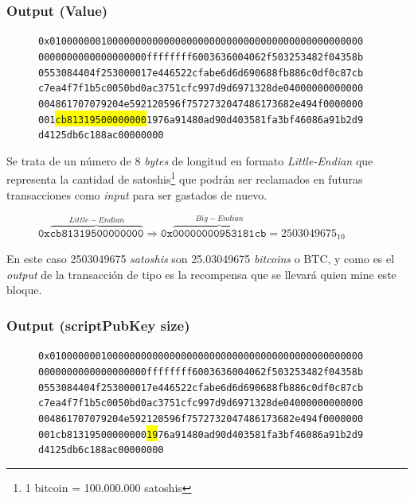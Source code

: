 \documentclass{article}
\begin{document}
    \subsubsection{Output (Value)}
    
    \begin{figure}[H]
        \texttt{0x0100000001000000000000000000000000000000000000000000000} \\
        \texttt{0000000000000000000ffffffff6003636004062f503253482f04358b} \\
        \texttt{0553084404f253000017e446522cfabe6d6d690688fb886c0df0c87cb} \\
        \texttt{c7ea4f7f1b5c0050bd0ac3751cfc997d9d6971328de04000000000000} \\
        \texttt{004861707079204e592120596f7572732047486173682e494f0000000} \\
        \texttt{001\colorbox{Yellow}{cb81319500000000}1976a91480ad90d403581fa3bf46086a91b2d9} \\
        \texttt{d4125db6c188ac00000000}
    \end{figure}
    
    Se trata de un número de 8 \textit{bytes} de longitud en formato \textit{Little-Endian} que representa la cantidad de satoshis\footnote{1 bitcoin = 100.000.000 satoshis} que podrán ser reclamados en futuras transacciones como \textit{input} para ser gastados de nuevo.
    \begin{figure}[H]
    \centering
        $\texttt{0x}\overbrace{\texttt{cb81319500000000}}^{Little-Endian} \Rightarrow \texttt{0x}\overbrace{\texttt{00000000953181cb}}^{Big-Endian} = 2503049675_{10}$
    \end{figure}
    
    En este caso 2503049675 \textit{satoshis} son 25.03049675 \textit{bitcoins} o BTC, y como es el \textit{output} de la transacción de tipo  es la recompensa que se llevará quien mine este bloque.
    
    \subsubsection{Output (scriptPubKey size)}
    
    \begin{figure}[H]
        \texttt{0x0100000001000000000000000000000000000000000000000000000} \\
        \texttt{0000000000000000000ffffffff6003636004062f503253482f04358b} \\
        \texttt{0553084404f253000017e446522cfabe6d6d690688fb886c0df0c87cb} \\
        \texttt{c7ea4f7f1b5c0050bd0ac3751cfc997d9d6971328de04000000000000} \\
        \texttt{004861707079204e592120596f7572732047486173682e494f0000000} \\
        \texttt{001cb81319500000000\colorbox{Yellow}{19}76a91480ad90d403581fa3bf46086a91b2d9} \\
        \texttt{d4125db6c188ac00000000}
    \end{figure}
    
\end{document}
